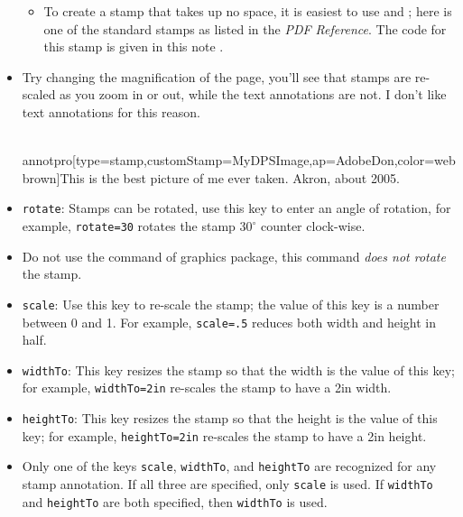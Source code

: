 \documentclass[12pt]{article}
\def\ameta#1{$\langle\textit{\texttt{#1}}\rangle$}
\def\darg#1{\texttt{\{#1\}}}
\begin{document}
\begin{itemize}
\begin{itemize}
\item To create a
    stamp that takes up no space, it is easiest
    to use  and \cs{makebox[0pt][l]\darg{\ameta{contents}}}; here is one of
    the standard stamps as listed in the \textsl{PDF Reference}. The code
    for this stamp is given in this note \annotpro{\annotstampiv}.
\end{itemize}

\item[] Try changing the magnification of the page, you'll see that stamps are re-scaled as you zoom in or out, while
the text annotations are not. I don't like text annotations for this reason.

\begin{defineJS}{\annotstampv}
\\annotpro[type=stamp,customStamp=MyDPSImage,ap=AdobeDon,color=webbrown]{This is the best picture of me ever taken. Akron, about 2005.}
\end{defineJS}

\item\texttt{rotate}: Stamps can be rotated, use this key to enter an angle of rotation, for example,
    \texttt{rotate=30} rotates the stamp $\text{30}^\circ$ counter clock-wise.

\item[\textcolor{red}{\ding{043}}] Do not use the  command of \textsf{graphics} package,
this command \emph{does not rotate} the stamp.

\item \texttt{scale}: Use this key to re-scale the stamp; the value of this key is a number between
    0 and 1. For example, \texttt{scale=.5} reduces both width and height in half.
\item \texttt{widthTo}: This key resizes the stamp so that the width is the value of this key; for example,
    \texttt{widthTo=2in} re-scales the stamp to have a 2in width.
\item\texttt{heightTo}: This key resizes the stamp so that the height is the value of this key; for example,
    \texttt{heightTo=2in} re-scales the stamp to have a 2in height.

\item[] Only one of the keys \texttt{scale}, \texttt{widthTo}, and \texttt{heightTo} are recognized
    for any stamp annotation. If all three are specified, only \texttt{scale} is used. If
    \texttt{widthTo} and \texttt{heightTo} are both specified, then \texttt{widthTo} is used.


\end{itemize}
\end{document}
